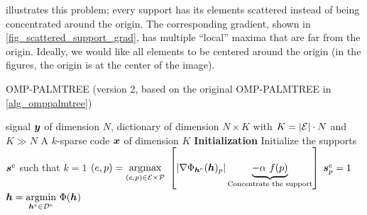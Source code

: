 \noindent
{} illustrates this problem; every support has its elements scattered instead of being concentrated around the origin. The corresponding gradient, shown in \cref{fig_scattered_support_grad}, has multiple “local” maxima that are far from the origin. Ideally, we would like all elements to be centered around the origin (in the figures, the origin is at the center of the image).

\begin{algorithm}[!ht]
    \caption{OMP-PALMTREE (version 2, based on the original OMP-PALMTREE in \cref{alg_omppalmtree})}\label{alg_omppalmtree2}
  \begin{algorithmic}[1]
    \Input signal $\bm{y}$ of dimension $N$, dictionary of 
   dimension $N \times K$ with $K = |\mathcal E| \cdot N$ and $K \gg N$
    \Output A $k$-sparse code $\bm{x}$ of dimension $K$
    \State \textbf{Initialization} Initialize the supports $\bm{s}^e$ such that $k=1$
      \State $(e,p) = \underset{(e,p) \in \mathcal E \times \mathcal P}{\operatorname*{\arg\!\max}}~ \left[ |\nabla \Phi_{\bm{h}^e}(\bm{h})_p| \underbrace{ - \alpha~f(p)}_{\text{Concentrate the support}} \right]$\label{alg_omppalmtree2_find}
      \State $\bm{s}^e_p = 1$
      \State $\bm{h} = \underset{\bm{h}^e \in {\mathcal D}^e}{\operatorname{argmin}}~ \Phi(\bm{h})$\label{alg_omppalmtree2_ftl}
    \EndFor
  \end{algorithmic}
\end{algorithm}

